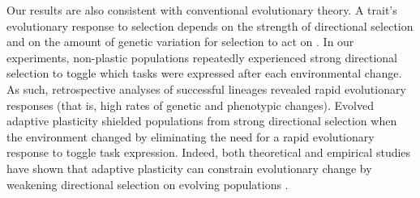 
Our results are also consistent with conventional evolutionary theory.
A trait's evolutionary response to selection depends on the strength of directional selection and on the amount of genetic variation for selection to act on \citep{lande_measurement_1983,zimmer_evolution_2013}.
In our experiments, non-plastic populations repeatedly experienced strong directional selection to toggle which tasks were expressed after each environmental change.
As such, retrospective analyses of successful lineages revealed rapid evolutionary responses (that is, high rates of genetic and phenotypic changes).
Evolved adaptive plasticity shielded populations from strong directional selection when the environment changed by eliminating the need for a rapid evolutionary response to toggle task expression.
Indeed, both theoretical and empirical studies have shown that adaptive plasticity can constrain evolutionary change by weakening directional selection on evolving populations \citep{price_role_2003,paenke_influence_2007,ghalambor_non-adaptive_2015}. 



